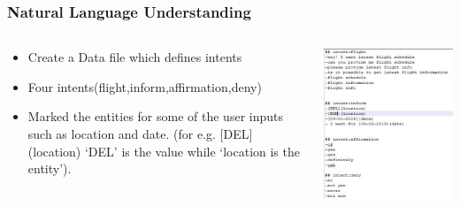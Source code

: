  \begin{frame}[fragile]\frametitle{Natural Language Understanding}
 
    \begin{columns}
    \begin{column}[t]{0.5\linewidth}
\begin{itemize}
\item Create a Data file which defines intents
\item Four intents(flight,inform,affirmation,deny)
\item Marked the entities for some of the user inputs such as location and date. (for e.g. [DEL](location) `DEL' is the value while `location is the entity').
\end{itemize}
\end{column}
    \begin{column}[t]{0.5\linewidth}
\begin{center}
\includegraphics[width=\linewidth,keepaspectratio]{images/mmt1}
\end{center}
\end{column}
\end{columns}
\end{frame}

